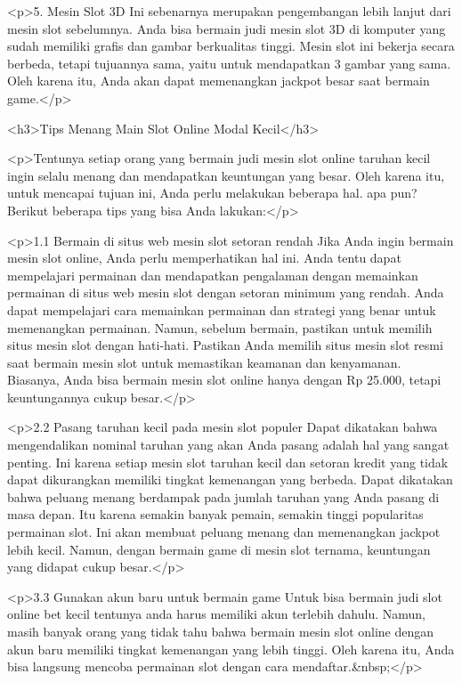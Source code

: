 {<p>5. Mesin Slot 3D Ini sebenarnya merupakan pengembangan lebih lanjut dari mesin slot sebelumnya. Anda bisa bermain judi mesin slot 3D di komputer yang sudah memiliki grafis dan gambar berkualitas tinggi. Mesin slot ini bekerja secara berbeda, tetapi tujuannya sama, yaitu untuk mendapatkan 3 gambar yang sama. Oleh karena itu, Anda akan dapat memenangkan jackpot besar saat bermain game.</p>



<h3>Tips Menang Main Slot Online Modal Kecil</h3>



<p>Tentunya setiap orang yang bermain judi mesin slot online taruhan kecil ingin selalu menang dan mendapatkan keuntungan yang besar. Oleh karena itu, untuk mencapai tujuan ini, Anda perlu melakukan beberapa hal. apa pun? Berikut beberapa tips yang bisa Anda lakukan:</p>



<p>1.1 Bermain di situs web mesin slot setoran rendah Jika Anda ingin bermain mesin slot online, Anda perlu memperhatikan hal ini. Anda tentu dapat mempelajari permainan dan mendapatkan pengalaman dengan memainkan permainan di situs web mesin slot dengan setoran minimum yang rendah. Anda dapat mempelajari cara memainkan permainan dan strategi yang benar untuk memenangkan permainan. Namun, sebelum bermain, pastikan untuk memilih situs mesin slot dengan hati-hati. Pastikan Anda memilih situs mesin slot resmi saat bermain mesin slot untuk memastikan keamanan dan kenyamanan. Biasanya, Anda bisa bermain mesin slot online hanya dengan Rp 25.000, tetapi keuntungannya cukup besar.</p>



<p>2.2 Pasang taruhan kecil pada mesin slot populer Dapat dikatakan bahwa mengendalikan nominal taruhan yang akan Anda pasang adalah hal yang sangat penting. Ini karena setiap mesin slot taruhan kecil dan setoran kredit yang tidak dapat dikurangkan memiliki tingkat kemenangan yang berbeda. Dapat dikatakan bahwa peluang menang berdampak pada jumlah taruhan yang Anda pasang di masa depan. Itu karena semakin banyak pemain, semakin tinggi popularitas permainan slot. Ini akan membuat peluang menang dan memenangkan jackpot lebih kecil. Namun, dengan bermain game di mesin slot ternama, keuntungan yang didapat cukup besar.</p>



<p>3.3 Gunakan akun baru untuk bermain game Untuk bisa bermain judi slot online bet kecil tentunya anda harus memiliki akun terlebih dahulu. Namun, masih banyak orang yang tidak tahu bahwa bermain mesin slot online dengan akun baru memiliki tingkat kemenangan yang lebih tinggi. Oleh karena itu, Anda bisa langsung mencoba permainan slot dengan cara mendaftar.&nbsp;</p>



}
